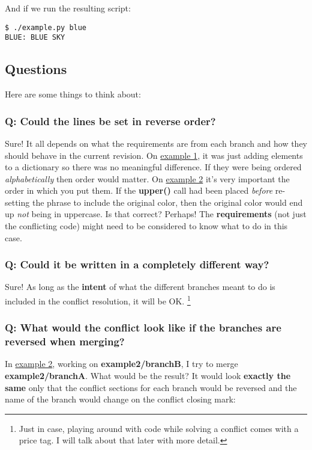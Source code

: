 And if we run the resulting script:
\begin{lstlisting}[style=console_style, caption={\bf example 2} - running resulting script]
$ ./example.py blue
BLUE: BLUE SKY
\end{lstlisting}

\subsection{Questions}
Here are some things to think about:

\subsubsection{Q: Could the lines be set in reverse order?}
Sure! It all depends on what the requirements are from each branch and how they should behave in the current revision.
On \hyperref[example_01]{example 1}, it was just adding elements to a dictionary so there was no meaningful difference.
If they were being ordered {\it alphabetically} then order would matter. On \hyperref[example_02]{example 2} it's very important
the order in which you put them. If the {\bf upper()} call had been placed {\it before} re-setting the phrase to include the
original color, then the original color would end up {\it not} being in uppercase. Is that correct? Perhaps! The
{\bf requirements} (not just the conflicting code) might need to be considered to know what to do in this case.

\subsubsection{Q: Could it be written in a completely different way?}
Sure! As long as the {\bf intent} of what the different branches meant to do is included in the conflict resolution, it will be OK.
\footnote{Just in case, playing around with code while solving a conflict comes with a price tag. I will talk about that later
with more detail.}

\subsubsection{Q: What would the conflict look like if the branches are reversed when merging?}
In \hyperref[example_02]{example 2}, working on {\bf example2/branchB}, I try to merge {\bf example2/branchA}. What would be the result?
It would look {\bf exactly the same} only that the conflict sections for each branch would be reversed and the name of the branch would
change on the conflict closing mark:

